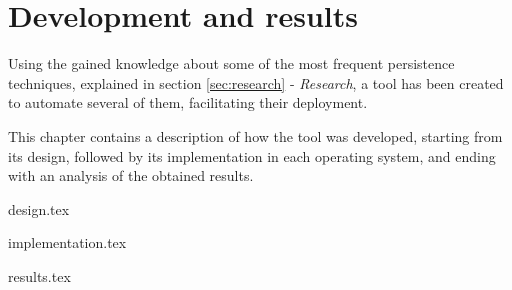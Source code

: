 \section{Development and results}
\label{sec:dev}
Using the gained knowledge about some of the most frequent persistence techniques, explained in section \ref{sec:research} - \textit{Research}, a tool has been created to automate several of them, facilitating their deployment.

This chapter contains a description of how the tool was developed, starting from its design, followed by its implementation in each operating system, and ending with an analysis of the obtained results.

{design.tex}

{implementation.tex}

{results.tex}

